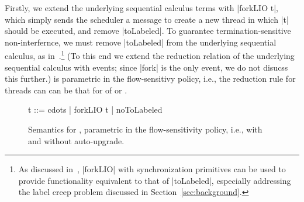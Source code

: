 %
Firstly, we extend the underlying sequential calculus terms with |forkLIO t|,
which simply sends the scheduler a message to create a new thread in which |t|
should be executed, and remove |toLabeled|.
%
To guarantee termination-sensitive non-interfernce, we must remove |toLabeled|
from the underlying sequential calculus, as in~.\footnote{
As discussed in~, |forkLIO| with synchronization primitives can be
used to provide functionality equivalent to that of |toLabeled|, especially
addressing the label creep problem discussed in Section~\ref{sec:background}.
}
%
(To this end we extend the reduction relation of the underlying sequential
calculus with events; since |fork| is the only event, we do not disucss this
further.)
%
\lioconc{} is parametric in the flow-sensitivy policy, i.e., the reduction rule
for threads can can be that  for of \liofs{} or \lioafs{}.
%
\begin{figure}[ht]
\small
\begin{code}
t    ::= cdots  | forkLIO t | noToLabeled
\end{code}
  \caption{Semantics for \lioconc{}, parametric in the flow-sensitivity policy,
  i.e., with and without auto-upgrade\label{fig:sos:conc}.}
\end{figure}



